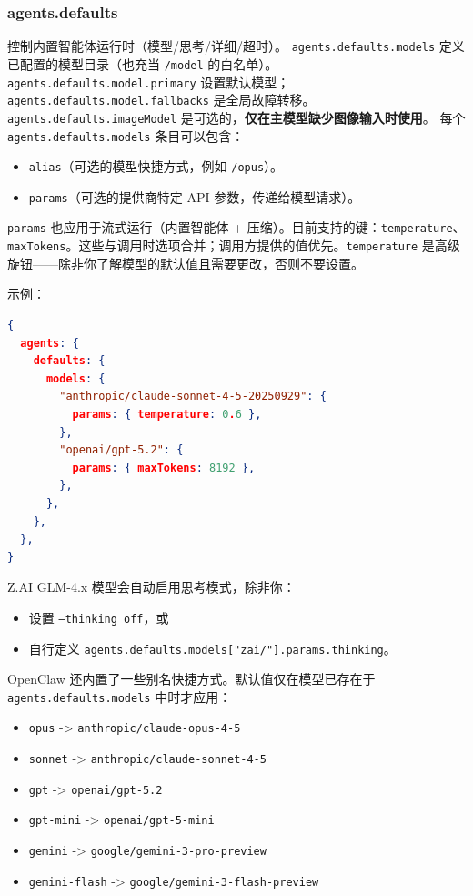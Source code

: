 \subsubsection{agents.defaults}


控制内置智能体运行时（模型/思考/详细/超时）。
\texttt{agents.defaults.models} 定义已配置的模型目录（也充当 \texttt{/model} 的白名单）。
\texttt{agents.defaults.model.primary} 设置默认模型；\texttt{agents.defaults.model.fallbacks} 是全局故障转移。
\texttt{agents.defaults.imageModel} 是可选的，\textbf{仅在主模型缺少图像输入时使用}。
每个 \texttt{agents.defaults.models} 条目可以包含：

\begin{itemize}
  \item \texttt{alias}（可选的模型快捷方式，例如 \texttt{/opus}）。
  \item \texttt{params}（可选的提供商特定 API 参数，传递给模型请求）。
\end{itemize}


\texttt{params} 也应用于流式运行（内置智能体 + 压缩）。目前支持的键：\texttt{temperature}、\texttt{maxTokens}。这些与调用时选项合并；调用方提供的值优先。\texttt{temperature} 是高级旋钮——除非你了解模型的默认值且需要更改，否则不要设置。

示例：

\begin{lstlisting}[language=json]
{
  agents: {
    defaults: {
      models: {
        "anthropic/claude-sonnet-4-5-20250929": {
          params: { temperature: 0.6 },
        },
        "openai/gpt-5.2": {
          params: { maxTokens: 8192 },
        },
      },
    },
  },
}
\end{lstlisting}


Z.AI GLM-4.x 模型会自动启用思考模式，除非你：

\begin{itemize}
  \item 设置 \texttt{--thinking off}，或
  \item 自行定义 \texttt{agents.defaults.models["zai/"].params.thinking}。
\end{itemize}


OpenClaw 还内置了一些别名快捷方式。默认值仅在模型已存在于 \texttt{agents.defaults.models} 中时才应用：

\begin{itemize}
  \item \texttt{opus} -> \texttt{anthropic/claude-opus-4-5}
  \item \texttt{sonnet} -> \texttt{anthropic/claude-sonnet-4-5}
  \item \texttt{gpt} -> \texttt{openai/gpt-5.2}
  \item \texttt{gpt-mini} -> \texttt{openai/gpt-5-mini}
  \item \texttt{gemini} -> \texttt{google/gemini-3-pro-preview}
  \item \texttt{gemini-flash} -> \texttt{google/gemini-3-flash-preview}
\end{itemize}


